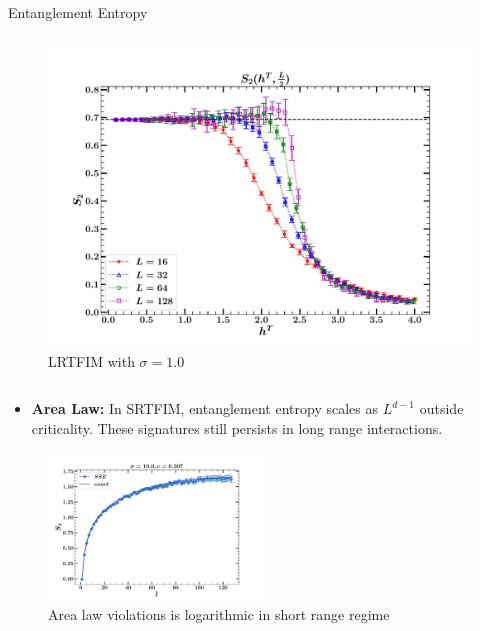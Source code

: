 \documentclass[final,hyperref={pdfpagelabels=false}]{beamer}
\begin{document}
\begin{frame}[t]
\begin{columns}[t]
\begin{column}{.48\textwidth}
\begin{block}{Entanglement Entropy}
\begin{columns}[T,onlytextwidth]
\begin{figure}[H]
\centering
\includegraphics[width=1.0\textwidth]{2023-tiwari-espresso-summer-school-poster-session-pimd-main/figures/entropy_Lrtfim_ratio_trick_sigma_1.0.pdf}
\caption{LRTFIM with $\sigma = 1.0$}
\end{figure}
\end{columns}
\begin{itemize}
    \item \textbf{Area Law:} In SRTFIM, entanglement entropy scales as $L^{d - 1}$ outside criticality. These signatures still persists in long range interactions. 
\end{itemize}
\begin{figure}[H]
\centering
\includegraphics[width=0.5\textwidth]{2023-tiwari-espresso-summer-school-poster-session-pimd-main/figures/entanglement_entropy_logarithmic_violations_critical_magnetic_fidlf_h_equal_1.pdf}
\caption{Area law violations is logarithmic in short range regime\cite{3}}
\end{figure}
\end{block}



\end{column}
\end{columns}
\end{frame}
\end{document}
